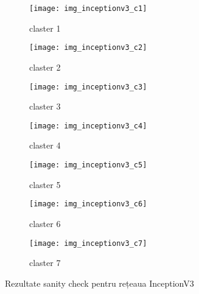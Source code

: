 \begin{figure}[!tbp]
  \centering
  \begin{subfigure}[b]{0.48\textwidth}
    \texttt{[image: img\_inceptionv3\_c1]}
    \caption{claster 1}
  \end{subfigure}
  \hfill
  \begin{subfigure}[b]{0.48\textwidth}
    \texttt{[image: img\_inceptionv3\_c2]}
    \caption{claster 2}
  \end{subfigure}
   \hfill
  \begin{subfigure}[b]{0.48\textwidth}
    \texttt{[image: img\_inceptionv3\_c3]}
    \caption{claster 3}
  \end{subfigure}
  \hfill
  \begin{subfigure}[b]{0.48\textwidth}
    \texttt{[image: img\_inceptionv3\_c4]}
    \caption{claster 4}
  \end{subfigure}
  \hfill
  \begin{subfigure}[b]{0.48\textwidth}
    \texttt{[image: img\_inceptionv3\_c5]}
    \caption{claster 5}
  \end{subfigure}
  \hfill
  \begin{subfigure}[b]{0.48\textwidth}
    \texttt{[image: img\_inceptionv3\_c6]}
    \caption{claster 6}
  \end{subfigure}
    \hfill
  \begin{subfigure}[b]{0.48\textwidth}
    \texttt{[image: img\_inceptionv3\_c7]}
    \caption{claster 7}
  \end{subfigure}
  \caption[Rezultate sanity check pentru rețeaua InceptionV3]{Rezultate sanity check pentru rețeaua InceptionV3}
\end{figure}


